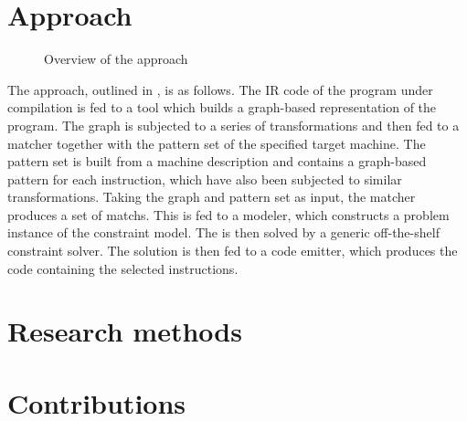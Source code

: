\section{Approach}

\begin{figure}
  \centering%
  

  \caption{Overview of the approach}
\end{figure}

The approach, outlined in , is as follows.
%
The \gls{IR} code of the \gls{program} under compilation is fed to a tool which
builds a \gls{graph}-based representation of the \gls{program}.
%
The \gls{graph} is subjected to a series of transformations and then fed to a
matcher together with the \gls{pattern set} of the specified \gls{target
  machine}.
%
The \gls{pattern set} is built from a \gls{machine description} and contains a
\gls{graph}-based \gls{pattern} for each \gls{instruction}, which have also been
subjected to similar transformations.
%
Taking the \gls{graph} and \gls{pattern set} as input, the matcher produces a
set of \glspl{match}.
%
This is fed to a modeler, which constructs a problem instance of the
\gls{constraint model}.
%
The  is then solved by a generic off-the-shelf
\gls{constraint solver}.
%
The \gls{solution} is then fed to a code emitter, which produces the code
containing the selected \glspl{instruction}.



\section{Research methods}


\section{Contributions}

